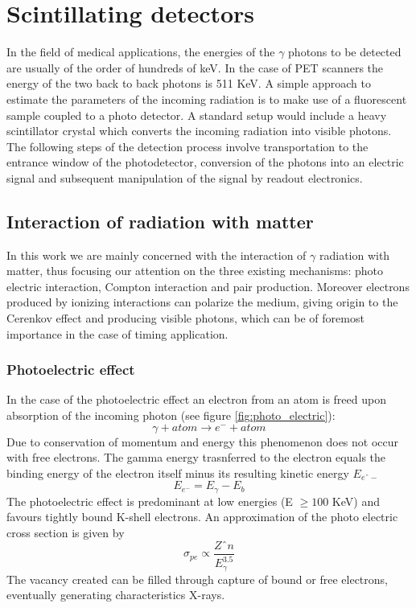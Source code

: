 

\chapter{Scintillating detectors}

In the field of medical applications, the energies of the $\gamma$ photons to be detected are usually of the order of hundreds of keV. In the case of PET scanners the energy of the two back to back photons is 511 KeV.
A simple approach to estimate the parameters of the incoming radiation is to make use of a fluorescent sample coupled to a photo detector. A standard setup would include a heavy scintillator crystal which converts the incoming radiation into visible photons. The following steps of the detection process involve transportation to the entrance window of the photodetector, conversion of the photons into an electric signal and subsequent manipulation of the signal by readout electronics.  


\section{Interaction of radiation with matter}
In this work we are mainly concerned with the interaction of $\gamma$ radiation with matter, thus focusing our attention on the three existing mechanisms: photo electric interaction, Compton interaction and pair production.
Moreover electrons produced by ionizing interactions can polarize the medium, giving origin to the Cerenkov effect and producing visible photons, which can be of foremost importance in the case of timing application.

\subsection{Photoelectric effect}

In the case of the photoelectric effect an electron from an atom is freed upon absorption of the incoming photon (see figure \ref{fig:photo_electric}):
\begin{equation}
\gamma + atom \rightarrow e^{-} + atom
\end{equation}
Due to conservation of momentum and energy this phenomenon does not occur with free electrons. 
The gamma energy trasnferred to the electron equals the binding energy of the electron itself minus its resulting kinetic energy $E_{eˆ{-}}$ 
\begin{equation}
E_{e^{-}} = E_{\gamma} - E_{b}
\end{equation}
The photoelectric effect is predominant at low energies (E $\geq 100$ KeV) and favours tightly bound K-shell electrons. An approximation of the photo electric cross section is given by
\begin{equation}
\sigma _{pe} \propto \frac{Zˆ{n}}{E_{\gamma}^{3.5}}
\end{equation}
The vacancy created can be filled through capture of bound or free electrons, eventually generating characteristics X-rays.  

